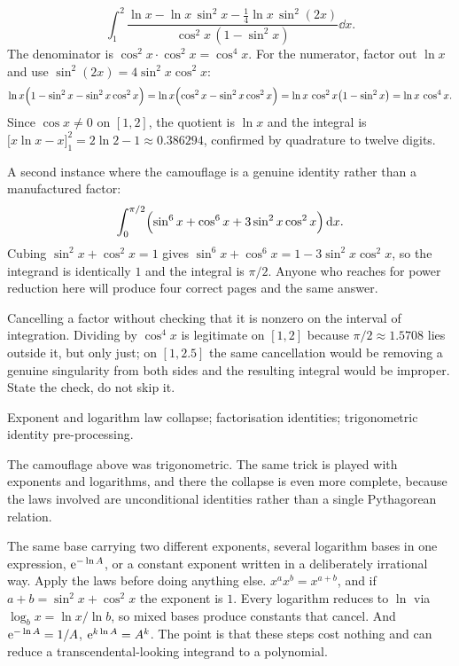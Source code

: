\begin{worked}
\[
\int_1^2\frac{\ln x-\ln x\,\sin^2x-\tfrac14\ln x\,\sin^2(2x)}{\cos^2x\,(1-\sin^2x)}\dd x .
\]
The denominator is $\cos^2x\cdot\cos^2x=\cos^4x$. For the numerator, factor out $\ln x$ and use $\sin^2(2x)=4\sin^2x\cos^2x$:
\[
\ln x\Bigl(1-\sin^2x-\sin^2x\cos^2x\Bigr)=\ln x\Bigl(\cos^2x-\sin^2x\cos^2x\Bigr)=\ln x\,\cos^2x\bigl(1-\sin^2x\bigr)=\ln x\,\cos^4x .
\]
Since $\cos x\neq0$ on $[1,2]$, the quotient is $\ln x$ and the integral is $\bigl[x\ln x-x\bigr]_1^2=2\ln2-1\approx0.386294$, confirmed by quadrature to twelve digits.

A second instance where the camouflage is a genuine identity rather than a manufactured factor:
\[
\int_0^{\pi/2}\Bigl(\sin^6x+\cos^6x+3\sin^2x\cos^2x\Bigr)\,\mathrm{d} x .
\]
Cubing $\sin^2x+\cos^2x=1$ gives $\sin^6x+\cos^6x=1-3\sin^2x\cos^2x$, so the integrand is identically $1$ and the integral is $\pi/2$. Anyone who reaches for power reduction here will produce four correct pages and the same answer.
\end{worked}

\begin{trap}
Cancelling a factor without checking that it is nonzero on the interval of integration. Dividing by $\cos^4x$ is legitimate on $[1,2]$ because $\pi/2\approx1.5708$ lies outside it, but only just; on $[1,2.5]$ the same cancellation would be removing a genuine singularity from both sides and the resulting integral would be improper. State the check, do not skip it.
\end{trap}

\begin{seealsob}Exponent and logarithm law collapse; factorisation identities; trigonometric identity pre-processing.\end{seealsob}

The camouflage above was trigonometric. The same trick is played with exponents and logarithms, and there the collapse is even more complete, because the laws involved are unconditional identities rather than a single Pythagorean relation.

\cue The same base carrying two different exponents, several logarithm bases in one expression, $\mathrm{e}^{-\ln A}$, or a constant exponent written in a deliberately irrational way.
\method Apply the laws before doing anything else. $x^ax^b=x^{a+b}$, and if $a+b=\sin^2x+\cos^2x$ the exponent is $1$. Every logarithm reduces to $\ln$ via $\log_bx=\ln x/\ln b$, so mixed bases produce constants that cancel. And $\mathrm{e}^{-\ln A}=1/A$, $\mathrm{e}^{k\ln A}=A^k$. The point is that these steps cost nothing and can reduce a transcendental-looking integrand to a polynomial.

